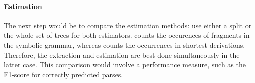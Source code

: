 \paragraph{Estimation}
The next step would be to compare the estimation methods: use either a split or the whole set of trees for both estimators. \ddop{} counts the occurences of fragments in the symbolic grammar, whereas \dops{} counts the occurrences in shortest derivations. Therefore, the extraction and estimation are best done simultaneously in the latter case. This comparison would involve a performance measure, such as the F1-score for correctly predicted parses.





























